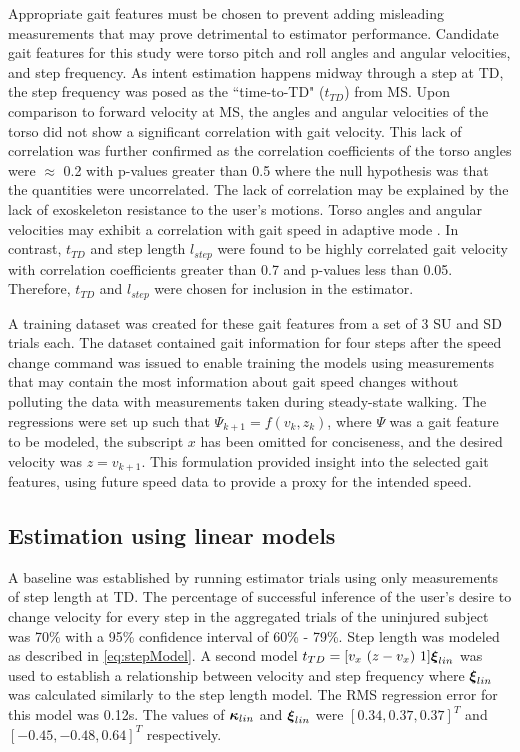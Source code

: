 Appropriate gait features must be chosen to prevent adding misleading measurements that may prove detrimental to estimator performance. Candidate gait features for this study were torso pitch and roll angles and angular velocities, and step frequency. As intent estimation happens midway through a step at TD, the step frequency was posed as the ``time-to-TD" ($ t_{TD} $) from MS. Upon comparison to forward velocity at MS, the angles and angular velocities of the torso did not show a significant correlation with gait velocity. This lack of correlation was further confirmed as the correlation coefficients of the torso angles were $ \approx $ 0.2 with p-values greater than 0.5 where the null hypothesis was that the quantities were uncorrelated. The lack of correlation may be explained by the lack of exoskeleton resistance to the user's motions. Torso angles and angular velocities may exhibit a correlation with gait speed in adaptive mode \cite{suzuki2007intention}. In contrast, $ t_{TD} $ and step length $ l_{step} $ were found to be highly correlated gait velocity with correlation coefficients greater than 0.7 and p-values less than 0.05. Therefore, $ t_{TD} $ and $ l_{step} $ were chosen for inclusion in the estimator. 

A training dataset was created for these gait features from a set of 3 SU and SD trials each. The dataset contained gait information for four steps after the speed change command was issued to enable training the models using measurements that may contain the most information about gait speed changes without polluting the data with measurements taken during steady-state walking. The regressions were set up such that $ \Psi_{k+1} = f(v_k,z_k) $, where $ \Psi $ was a gait feature to be modeled, the subscript $ x $ has been omitted for conciseness, and the desired velocity was $ z = v_{k+1} $. This formulation provided insight into the selected gait features, using future speed data to provide a proxy for the intended speed.

\subsection{Estimation using linear models}

A baseline was established by running estimator trials using only measurements of step length at TD. The percentage of successful inference of the user's desire to change velocity for every step in the aggregated trials of the uninjured subject was 70\% with a 95\% confidence interval of 60\% - 79\%. Step length was modeled as described in \eqref{eq:stepModel}. A second model $t_{TD} =  [v_x\ (z - v_x)\ 1] \boldsymbol{\xi}_{lin}$ was used to establish a relationship between velocity and step frequency where $ \boldsymbol{\xi}_{lin} $ was calculated similarly to the step length model. The RMS regression error for this model was 0.12s. The values of $ \boldsymbol{\kappa}_{lin} $ and $ \boldsymbol{\xi}_{lin} $ were $[0.34 ,0.37 ,0.37]^T$ and $ [-0.45 ,-0.48 ,0.64]^T $ respectively. 

